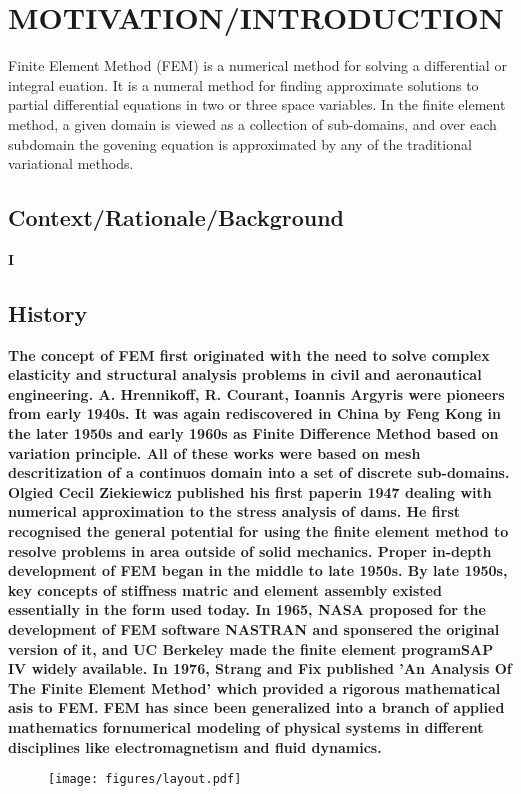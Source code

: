 




\chapter{MOTIVATION/INTRODUCTION}
          \centering
Finite Element Method (FEM) is a numerical method for solving a differential or integral euation. It is a numeral method for finding approximate solutions to partial differential equations in two or three space variables. In the finite element method, a given domain is viewed as a collection of sub-domains, and over each subdomain the govening equation is approximated by any of the traditional variational methods.
\section{{\bf{Context/Rationale/Background}}}
{\bf\color{red}I\section{{\bf{History}}}
{\bf\color{red}The concept of FEM first originated with the need to solve complex elasticity and structural analysis problems in civil and aeronautical engineering.  A. Hrennikoff, R. Courant, Ioannis Argyris were pioneers from early 1940s. It was again rediscovered in China by Feng Kong in the later 1950s and early 1960s as Finite Difference Method based on variation principle. All of these works were based on mesh descritization of a continuos domain into a set of discrete sub-domains.
Olgied Cecil Ziekiewicz published his first paperin 1947 dealing with numerical approximation to the stress analysis of dams. He first recognised the general potential for using the finite element method to resolve problems in area outside of solid mechanics. 
Proper in-depth development of FEM began in the middle to late 1950s. By late 1950s, key concepts of stiffness matric and element assembly existed essentially in the form used today. In 1965, NASA proposed for the development of FEM software NASTRAN and sponsered the original version of it, and UC Berkeley made the finite element programSAP IV widely available. 
In 1976, Strang and Fix published 'An Analysis Of The Finite Element Method' which provided a rigorous mathematical asis to FEM. FEM has since been generalized into a branch of applied mathematics fornumerical modeling of physical systems in different disciplines like electromagnetism and fluid dynamics.   }}
\begin{figure}[h]
	\texttt{[image: figures/layout.pdf]}
\end{figure}




